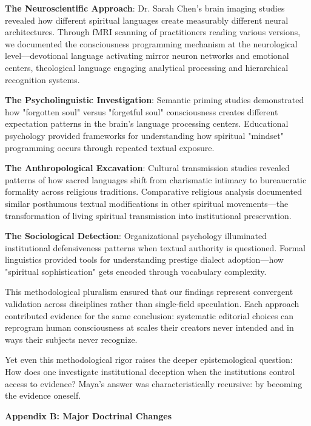 \documentclass[11pt,twoside]{book}
\makeatletter
\def\cleardoublepage{\clearpage\if@twoside \ifodd\c@page\else\hbox{}\thispagestyle{empty}\newpage\if@twocolumn\hbox{}\newpage\fi\fi\fi}
\makeatother
\begin{document}
\textbf{\textbf{The Neuroscientific Approach}}: Dr. Sarah Chen's brain imaging studies revealed how different spiritual languages create measurably different neural architectures. Through fMRI scanning of practitioners reading various versions, we documented the consciousness programming mechanism at the neurological level—devotional language activating mirror neuron networks and emotional centers, theological language engaging analytical processing and hierarchical recognition systems.

\textbf{\textbf{The Psycholinguistic Investigation}}: Semantic priming studies demonstrated how "forgotten soul" versus "forgetful soul" consciousness creates different expectation patterns in the brain's language processing centers. Educational psychology provided frameworks for understanding how spiritual "mindset" programming occurs through repeated textual exposure.

\textbf{\textbf{The Anthropological Excavation}}: Cultural transmission studies revealed patterns of how sacred languages shift from charismatic intimacy to bureaucratic formality across religious traditions. Comparative religious analysis documented similar posthumous textual modifications in other spiritual movements—the transformation of living spiritual transmission into institutional preservation.

\textbf{\textbf{The Sociological Detection}}: Organizational psychology illuminated institutional defensiveness patterns when textual authority is questioned. Formal linguistics provided tools for understanding prestige dialect adoption—how "spiritual sophistication" gets encoded through vocabulary complexity.

This methodological pluralism ensured that our findings represent convergent validation across disciplines rather than single-field speculation. Each approach contributed evidence for the same conclusion: systematic editorial choices can reprogram human consciousness at scales their creators never intended and in ways their subjects never recognize.

Yet even this methodological rigor raises the deeper epistemological question: How does one investigate institutional deception when the institutions control access to evidence? Maya's answer was characteristically recursive: by becoming the evidence oneself.

\clearpage
\thispagestyle{empty}
\mbox{}
\newpage
\pagestyle{sectionopening}
\cleardoublepage
\thispagestyle{empty}
\vspace*{0.25\textheight}
\begin{center}
{\Huge\bfseries Appendix B: Major Doctrinal Changes}
\end{center}
\vspace*{\fill}
\cleardoublepage
\end{document}
